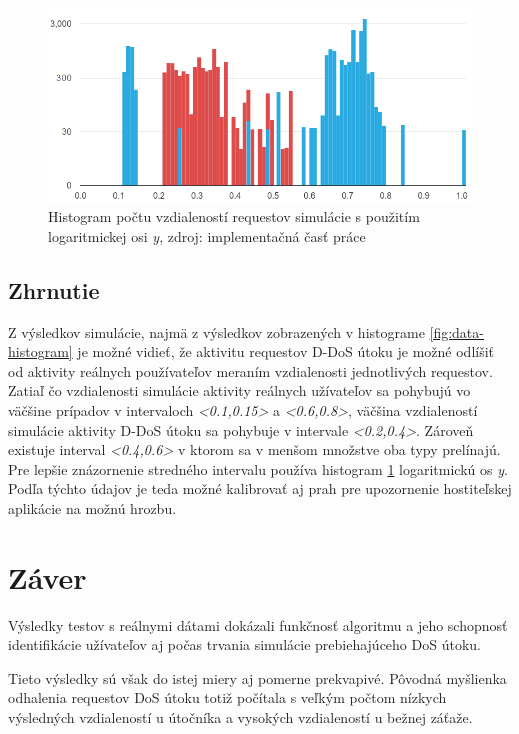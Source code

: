 \documentclass[
  digital, %
  table,   %
  lof,     %
  nolot,   %
  nocover
]{fithesis3}
\begin{document}
\begin{figure}[h]
  \centering
    \includegraphics[width=\textwidth]{images/data-histogram-log.png}
  \caption{Histogram počtu vzdialeností requestov simulácie s použitím logaritmickej
  osi \textit{y}, zdroj: implementačná časť práce}
  \label{fig:data-histogram-log}
\end{figure}

\section{Zhrnutie}
Z výsledkov simulácie, najmä z výsledkov zobrazených v histograme
\ref{fig:data-histogram} je možné vidieť, že aktivitu requestov D-DoS útoku je
možné odlíšiť od aktivity reálnych používateľov meraním vzdialenosti
jednotlivých requestov. Zatiaľ čo vzdialenosti simulácie aktivity reálnych
užívateľov sa pohybujú vo väčšine prípadov v intervaloch \textit{<0.1,0.15>} a \textit{<0.6,0.8>},
väčšina vzdialeností simulácie aktivity D-DoS útoku sa pohybuje v intervale
\textit{<0.2,0.4>}. Zároveň existuje interval \textit{<0.4,0.6>} v ktorom sa v menšom
množstve oba typy prelínajú. Pre lepšie znázornenie stredného intervalu používa
histogram \ref{fig:data-histogram-log} logaritmickú os \textit{y}.
Podľa týchto údajov je teda možné kalibrovať aj prah pre
upozornenie hostiteľskej aplikácie na možnú hrozbu. 

\chapter{Záver}
Výsledky testov s reálnymi dátami dokázali funkčnosť algoritmu a jeho schopnosť
identifikácie užívateľov aj počas trvania simulácie prebiehajúceho DoS útoku.

Tieto výsledky sú však do istej miery aj pomerne prekvapivé. Pôvodná myšlienka
odhalenia requestov DoS útoku totiž počítala s veľkým počtom nízkych výsledných
vzdialeností u útočníka a vysokých vzdialeností u bežnej záťaže. 
\end{document}
